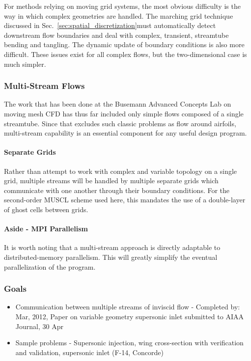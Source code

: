 \documentclass[12pt,letterpaper]{article}
\begin{document}
For methods relying on moving grid systems, the most obvious difficulty is
the way in which complex geometries are handled. The marching grid
technique discussed in Sec.~\ref{sec:spatial_discretization}must automatically
detect downstream flow
boundaries and deal with complex, transient, streamtube bending and
tangling. The dynamic update of boundary conditions is also more
difficult. These issues exist for all complex flows, but the
two-dimensional case is much simpler.
\subsubsection{Multi-Stream Flows}
The work that has been done at the Busemann Advanced Concepts Lab on
moving mesh CFD has thus far included only simple flows composed of a
single streamtube. Since that excludes such classic problems as flow
around airfoils, multi-stream capability is an essential component
for any useful design program.
\paragraph{Separate Grids}
Rather than attempt to work with complex and variable
topology on a single grid, multiple
streams will be handled by multiple separate grids which communicate
with one another through their boundary conditions. For the second-order
MUSCL scheme used here, this mandates the use of a double-layer of
ghost cells between grids.

\paragraph{Aside - MPI Parallelism}
It is worth noting that a multi-stream approach is directly adaptable
to distributed-memory parallelism. This will greatly simplify the
eventual parallelization of the program.
\subsubsection{Goals}
\begin{itemize}
\item Communication between multiple streams of inviscid flow -
  Completed 
  by: Mar, 2012, Paper on variable geometry supersonic inlet submitted
  to AIAA Journal, 30 Apr
\item Sample problems - Supersonic injection, wing cross-section with
  verification and validation, supersonic
  inlet (F-14, Concorde)
\end{itemize}
\end{document}

